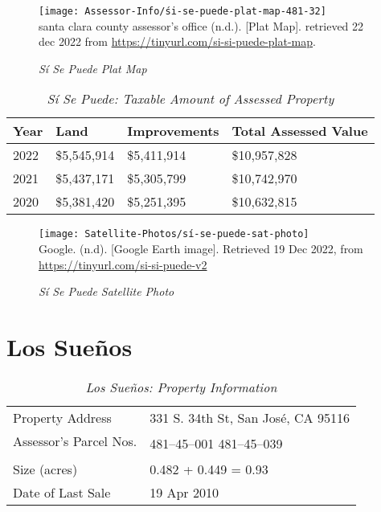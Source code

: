 \begin{figure}[hbt]
  \centering
  \caption[Sí Se Puede Plat Map]{\textit{Sí Se Puede Plat Map}}\label{fig:sí-se-puede-plat-map}
    \texttt{[image: Assessor-Info/śi-se-puede-plat-map-481-32]}\\ %
  \footnotesize{santa clara county assessor's office (n.d.). [Plat Map]. retrieved 22 dec 2022 from \url{https://tinyurl.com/si-si-puede-plat-map}}.
\end{figure}

\begin{table}[htb]
  \SingleSpacing%
  \caption[Sí Se Puede: Taxable Amount of Assessed Property]{\textit{Sí Se Puede: Taxable Amount of Assessed Property}}\label{tab:sí-se-puede-taxable-amount}
  \begin{tabular}{llll}
    \toprule
    Year & Land        & Improvements & Total Assessed Value \\
    \midrule
    2022 & \$5,545,914 & \$5,411,914  & \$10,957,828 \\
    2021 & \$5,437,171 & \$5,305,799  & \$10,742,970 \\
    2020 & \$5,381,420 & \$5,251,395  & \$10,632,815 \\
    \bottomrule
  \end{tabular}
\end{table}

\begin{figure}[hbt]
  \centering
  \caption[Sí Se Puede Satellite Photo]{\textit{Sí Se Puede Satellite Photo}}\label{fig:sí-se-puede-sat-photo}
  \texttt{[image: Satellite-Photos/sí-se-puede-sat-photo]}\\ %
  \footnotesize
  Google. (n.d). [Google Earth image]. Retrieved 19 Dec 2022, from \url{https://tinyurl.com/si-si-puede-v2} %
\end{figure}


\clearpage
\section{Los Sueños}\label{sec:los-suenos-info}\indent

\begin{table}[htb]
  \SingleSpacing%
  \caption[Los Sueños: Property Information]{\textit{Los Sueños: Property Information}}\label{tab:los-sueños-prop-info}
  \begin{tabular}{ll}
    \toprule
    Property Address       & 331 S. 34th St, San José, CA 95116 \\
    Assessor's Parcel Nos. & \multirow[t]{2}{1in}{481–45–001 481–45–039} \\
    \\
    Size (acres)           & 0.482 + 0.449 = 0.93 \\
    Date of Last Sale      & 19 Apr 2010 \\
    \bottomrule
  \end{tabular}
\end{table}

